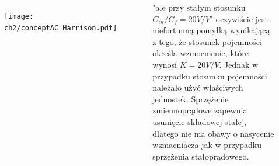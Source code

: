 \begin{frame}[t]
    \vspace{-1em}
    \begin{block}{\dk}
    \end{block}

    \begin{block}{\dk}
    \end{block}

    \begin{columns}

        \begin{figure}[H]
            \texttt{[image: ch2/conceptAC\_Harrison.pdf]} 
        \end{figure}
    
        "ale przy stałym stosunku $C_{in}/C_{f} = 20 V/V$" oczywiście jest niefortunną pomyłką wynikającą z tego, że stosunek pojemności określa wzmocnienie, które wynosi $K = 20 V/V$. Jednak w przypadku stosunku pojemności należało użyć właściwych jednostek.
        Sprzężenie zmiennoprądowe zapewnia usunięcie składowej stałej, dlatego nie ma obawy o nasycenie wzmacniacza jak w przypadku sprzężenia stałoprądowego.
    \end{columns}

\end{frame}

